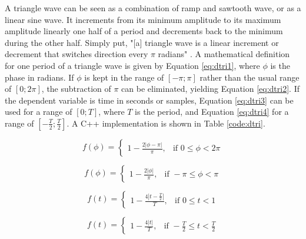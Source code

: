 A triangle wave can be seen as a combination of ramp and sawtooth wave, or as a linear sine wave. It increments from its minimum amplitude to its maximum amplitude linearly one half of a period and decrements back to the minimum during the other half. Simply put, "[a] triangle wave is a linear increment or decrement that switches direction every $\pi$ radians" . A mathematical definition for one period of a triangle wave is given by Equation  \ref{eq:dtri1}, where $\phi$ is the phase in radians. If $\phi$ is kept in the range of $[-\pi;\pi]$ rather than the usual range of $[0;2 \pi]$, the subtraction of $\pi$ can be eliminated, yielding Equation  \ref{eq:dtri2}. If the dependent variable is time in seconds or samples, Equation  \ref{eq:dtri3} can be used for a range of $[0;T]$, where $T$ is the period, and Equation  \ref{eq:dtri4} for a range of $[-\frac{T}{2};\frac{T}{2}]$. A C++ implementation is shown in Table \ref{code:dtri}.

\begin{multicols}{2}

  \begin{equation}
    f(\phi) =
    \begin{cases}
      1 - \frac{2 |\phi - \pi|}{\pi},& \text{if } 0 \leq \phi < 2 \pi
    \end{cases}
    \label{eq:dtri1}
  \end{equation}

  \begin{equation}
    f(\phi) =
    \begin{cases}
      1 - \frac{2 |\phi|}{\pi},& \text{if } -\pi \leq \phi < \pi
    \end{cases}
    \label{eq:dtri2}
  \end{equation}

\end{multicols}

\begin{multicols}{2}

  \begin{equation}
    f(t) =
    \begin{cases}
      1 - \frac{4 |t - \frac{T}{2}|}{T},& \text{if } 0 \leq t < 1
    \end{cases}
    \label{eq:dtri3}
  \end{equation}

  \begin{equation}
    f(t) =
    \begin{cases}
      1 - \frac{4 |t|}{T},& \text{if } -\frac{T}{2} \leq t < \frac{T}{2}
    \end{cases}
    \label{eq:dtri4}
  \end{equation}

\end{multicols}

